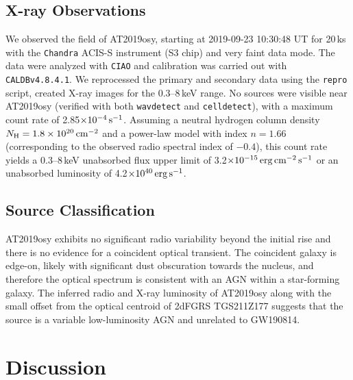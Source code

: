 \subsection{X-ray Observations}
\label{subsec:gw190814_xray}
\vspace{-4pt}
We observed the field of AT2019osy, starting at 2019-09-23 10:30:48 UT for 20\,ks with the \texttt{Chandra} ACIS-S instrument (S3 chip) and very faint data mode. The data were analyzed with \texttt{CIAO} \citep[v 4.11;][]{2006SPIE.6270E..1VF} and calibration was carried out with \texttt{CALDBv4.8.4.1}. We reprocessed the primary and secondary data using the \texttt{repro} script, created X-ray images for the 0.3--8\,keV  range.  No sources were visible near AT2019osy (verified with both \texttt{wavdetect} and \texttt{celldetect}), with a maximum count rate of 2.85$\times10^{-4}\,{\rm s}^{-1}$. Assuming a neutral hydrogen column density $N_{\rm H}=1.8\times10^{20}\,{\rm cm}^{-2}$ and a power-law model with index $n=1.66$ (corresponding to the observed radio spectral index of $-0.4$), this count rate yields a 0.3--8\,keV unabsorbed flux upper limit of 3.2$\times10^{-15}\,{\rm erg\,cm}^{-2}\,{\rm s}^{-1}$ \citep[as reported in][]{GCN25822} or an unabsorbed luminosity of 4.2$\times10^{40}\,{\rm erg\,s}^{-1}$.
\vspace{-4pt}
\subsection{Source Classification}
\vspace{-4pt}
AT2019osy exhibits no significant radio variability beyond the initial rise and there is no evidence for a coincident optical transient. The coincident galaxy is edge-on, likely with significant dust obscuration towards the nucleus, and therefore the optical spectrum is consistent with an AGN within a star-forming galaxy. The inferred radio and X-ray luminosity of AT2019osy along with the small offset from the optical centroid of 2dFGRS TGS211Z177 suggests that the source is a variable low-luminosity AGN \citep{2012A&A...545A..66B} and unrelated to GW190814.
\vspace{-4pt}
\section{Discussion}
\vspace{-6pt}
